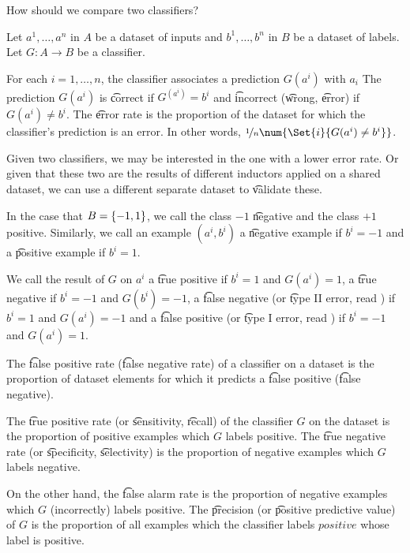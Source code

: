 

How should we compare two classifiers?


Let $a^1, \dots, a^n$ in $A$ be a dataset of inputs and $b^1, \dots, b^n$ in $B$ be a dataset of labels.
Let $G: A \to B$ be a classifier.

For each $i = 1, \dots, n$, the classifier associates a prediction $G(a^i)$ with $a_i$
The prediction $G(a^i)$ is \t{correct} if $G^(a^i) = b^i$ and \t{incorrect} (\t{wrong}, \t{error}) if $G(a^i) \neq b^i$.
The \t{error rate} is the proportion of the dataset for which the classifier's prediction is an error.
In other words, $\nicefrac{1}{n}\num{\Set{i}{G(a^i) \neq b^i}}$.

Given two classifiers, we may be interested in the one with a lower error rate.
Or given that these two are the results of different inductors applied on a shared dataset, we can use a different separate dataset to \t{validate} these.


In the case that $B = \{-1, 1\}$, we call the class $-1$ \t{negative} and the class $+1$ positive.
Similarly, we call an example $(a^i, b^i)$ a \t{negative example} if $b^i = -1$ and a \t{positive example} if $b^i = 1$.

We call the result of $G$ on $a^i$ a \t{true positive} if $b^i = 1$ and $G(a^i) = 1$, a \t{true negative} if $b^i = -1$ and $G(b^i) = -1$, a \t{false negative} (or \t{type II error}, read ) if $b^i = 1$ and $G(a^i) = -1$ and a \t{false positive} (or \t{type I error}, read ) if $b^i = -1$ and $G(a^i) = 1$.

The \t{false positive rate} (\t{false negative rate}) of a classifier on a dataset is the proportion of dataset elements for which it predicts a \t{false positive} (\t{false negative}).

The \t{true positive rate} (or \t{sensitivity}, \t{recall}) of the classifier $G$ on the dataset is the proportion of positive examples which $G$ labels positive.
The \t{true negative rate} (or \t{specificity}, \t{selectivity}) is the proportion of negative examples which $G$ labels negative.

On the other hand, the \t{false alarm rate} is the proportion of negative examples which $G$ (incorrectly) labels positive.
The \t{precision} (or \t{positive predictive value}) of $G$ is the proportion of all examples which the classifier labels $positive$ whose label is positive.

\blankpage
